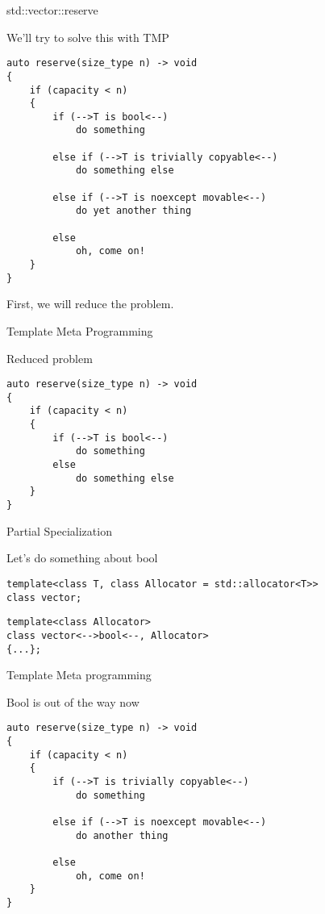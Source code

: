 \documentclass[aspectratio=169,xcolor=dvipsnames]{beamer}
\begin{document}
\begin{frame}[fragile]{std::vector::reserve}
    \begin{block}{We'll try to solve this with TMP}
        \begin{lstlisting}
auto reserve(size_type n) -> void
{
    if (capacity < n)
    {
        if (-->T is bool<--)
            do something

        else if (-->T is trivially copyable<--)
            do something else

        else if (-->T is noexcept movable<--)
            do yet another thing

        else
            oh, come on!
    }
}
        \end{lstlisting}
    \end{block}
    \pause First, we will reduce the problem.
\end{frame}

\begin{frame}[fragile]{Template Meta Programming}
    \begin{block}{Reduced problem}
        \begin{lstlisting}
auto reserve(size_type n) -> void
{
    if (capacity < n)
    {
        if (-->T is bool<--)
            do something
        else
            do something else
    }
}
        \end{lstlisting}
    \end{block}
\end{frame}

\begin{frame}[fragile]{Partial Specialization}
    \begin{block}{Let's do something about bool}
        \begin{lstlisting}
template<class T, class Allocator = std::allocator<T>>
class vector;
        \end{lstlisting}
\pause
        \begin{lstlisting}
template<class Allocator>
class vector<-->bool<--, Allocator>
{...};
        \end{lstlisting}
    \end{block}
\end{frame}

\begin{frame}[fragile]{Template Meta programming}
    \begin{block}{Bool is out of the way now}
        \begin{lstlisting}
auto reserve(size_type n) -> void
{
    if (capacity < n)
    {
        if (-->T is trivially copyable<--)
            do something

        else if (-->T is noexcept movable<--)
            do another thing

        else
            oh, come on!
    }
}
        \end{lstlisting}
    \end{block}
\end{frame}
\end{document}
